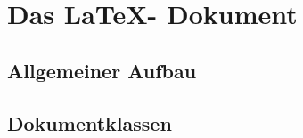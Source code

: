 \chapter{Das \LaTeX - Dokument}
\label{cha:dokument}
\section{Allgemeiner Aufbau}
\section{Dokumentklassen}
